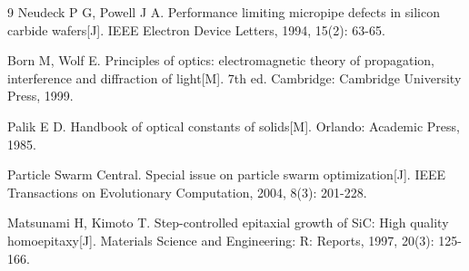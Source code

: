 \documentclass{cumcmthesis}
\begin{document}
\begin{thebibliography}{9}
Neudeck P G, Powell J A.
\newblock Performance limiting micropipe defects in silicon carbide wafers[J].
\newblock IEEE Electron Device Letters, 1994, 15(2): 63-65.

Born M, Wolf E.
\newblock Principles of optics: electromagnetic theory of propagation, interference and diffraction of light[M].
\newblock 7th ed. Cambridge: Cambridge University Press, 1999.

Palik E D.
\newblock Handbook of optical constants of solids[M].
\newblock Orlando: Academic Press, 1985.

Particle Swarm Central.
\newblock Special issue on particle swarm optimization[J].
\newblock IEEE Transactions on Evolutionary Computation, 2004, 8(3): 201-228.

Matsunami H, Kimoto T.
\newblock Step-controlled epitaxial growth of SiC: High quality homoepitaxy[J].
\newblock Materials Science and Engineering: R: Reports, 1997, 20(3): 125-166.
\end{thebibliography}
\end{document}
